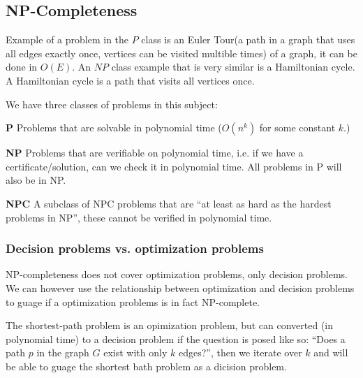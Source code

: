 \subsection{NP-Completeness}
Example of a problem in the $P$ class is an Euler Tour(a path in a graph that
uses all edges exactly once, vertices can be visited multible times) of a graph,
it can be done in $O(E)$. An $NP$ class example that is very similar is a
Hamiltonian cycle. A Hamiltonian cycle is a path that visits all vertices once.

We have three classes of problems in this subject:
\begin{itemize*}
\item[\textbf{P}] Problems that are solvable in polynomial time ($O(n^k)$ for
  some constant $k$.)
\item[\textbf{NP}] Problems that are verifiable on polynomial time, i.e. if we
  have a certificate/solution, can we check it in polynomial time. All problems
  in P will also be in NP.
\item[\textbf{NPC}] A subclass of NPC problems that are ``at least as hard as
  the hardest problems in NP'', these cannot be verified in polynomial time.
\end{itemize*}

\subsubsection{Decision problems vs. optimization problems}
NP-completeness does not cover optimization problems, only decision problems. We
can however use the relationship between optimization and decision problems to
guage if a optimization problems is in fact NP-complete.

The shortest-path problem is an opimization problem, but can converted (in
polynomial time) to a decision problem if the question is posed like so: ``Does
a path $p$ in the graph $G$ exist with only $k$ edges?'', then we iterate over
$k$ and will be able to guage the shortest bath problem as a dicision problem.

